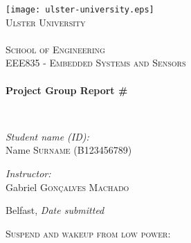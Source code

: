 \documentclass[12pt,a4paper]{article}
\begin{document}
\begin{titlepage}
\begin{center}

\texttt{[image: ulster-university.eps]}~\\[1cm]

\textsc{\LARGE Ulster University \\ \ \\ School of Engineering}\\[1.5cm]

\textsc{\Large EEE835 - Embedded Systems and Sensors}\\[0.5cm]

\HRule \\[0.4cm]
{ \huge \bfseries Project Group Report \#\\[0.4cm] }

\HRule \\[1.5cm]
\end{center}
\begin{minipage}{0.4\textwidth}
\begin{flushleft} \large
\emph{Student name (ID):}\\
Name \textsc{Surname} (B123456789) \\
\end{flushleft}
\end{minipage}
\begin{minipage}[b]{0.4\textwidth}
\begin{flushright} \large
\emph{Instructor:} \\
Gabriel  \textsc{Gon\c{c}alves Machado}
\end{flushright}
\end{minipage}

\vfill

\begin{center}
{\large Belfast, \textit{Date submitted}}
\end{center}

\end{titlepage}

\clearpage

\textsc{\LARGE Suspend and wakeup from low power: }\\[1.5cm]
\end{document}
